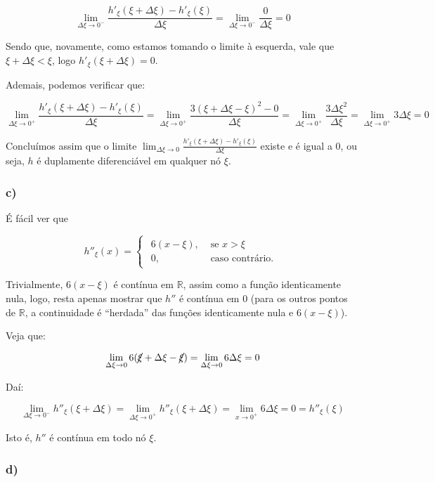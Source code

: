 \documentclass[
]{article}
\begin{document}
\[
\lim_{\Delta \xi \rightarrow0^-}\frac{h'_\xi(\xi+\Delta \xi)-h'_\xi(\xi)}{\Delta \xi}=\lim_{\Delta \xi \rightarrow0^-}\frac{0}{\Delta \xi}=0
\]

Sendo que, novamente, como estamos tomando o limite à esquerda, vale que
\(\xi+\Delta \xi<\xi\), logo \(h'_\xi(\xi+\Delta \xi)=0\).

Ademais, podemos verificar que:

\[
\lim_{\Delta \xi \rightarrow0^+}\frac{h'_\xi(\xi+\Delta \xi)-h'_\xi(\xi)}{\Delta \xi}=\lim_{\Delta \xi \rightarrow0^+}\frac{3(\xi+\Delta\xi-\xi)^2-0}{\Delta \xi}=\lim_{\Delta \xi \rightarrow0^+}\frac{3\Delta\xi^2}{\Delta \xi}=\lim_{\Delta \xi \rightarrow0^+}3\Delta\xi=0
\]

Concluímos assim que o limite
\(\lim_{\Delta \xi \rightarrow0}\frac{h'_\xi(\xi+\Delta \xi)-h'_\xi(\xi)}{\Delta \xi}\)
existe e é igual a \(0\), ou seja, \(h\) é duplamente diferenciável em
qualquer nó \(\xi\).

\hypertarget{c}{%
\subsubsection{c)}\label{c}}

É fácil ver que

\[
h''_\xi(x)=
\begin{cases}
\begin{aligned}
6(x-\xi),&\text{ se }x>\xi\\
0,&\text{ caso contrário.}
\end{aligned}
\end{cases}
\]

Trivialmente, \(6(x-\xi)\) é contínua em \(\mathbb{R}\), assim como a
função identicamente nula, logo, resta apenas mostrar que \(h''\) é
contínua em \(0\) (para os outros pontos de \(\mathbb{R}\), a
continuidade é ``herdada'' das funções identicamente nula e
\(6(x-\xi)\)).

Veja que:

\[
\lim_{\Delta\xi \rightarrow 0} 6(\cancel{\xi}+\Delta\xi-\cancel{\xi})=\lim_{\Delta\xi \rightarrow 0} 6\Delta\xi=0
\]

Daí:

\[
\lim_{\Delta \xi \rightarrow 0^-} h''_\xi(\xi+\Delta\xi)=\lim_{\Delta \xi \rightarrow 0^+} h''_\xi(\xi+\Delta\xi)=\lim_{x \rightarrow 0^+} 6\Delta\xi=0=h''_\xi(\xi)
\]

Isto é, \(h''\) é contínua em todo nó \(\xi\).

\hypertarget{d}{%
\subsubsection{d)}\label{d}}
\end{document}
